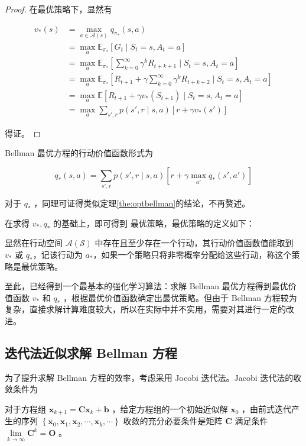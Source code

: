 \begin{proof}
    在最优策略下，显然有

     \[
    \begin{aligned}v_*(s) &= \max_{a\in \mathcal A(s)}q_{\pi_*}(s,a) \\ &=\max_a \mathbb{E}_{\pi_*} \left[G_t \mid S_t=s, A_t=a \right] \\ &= \max_a \mathbb{E}_{\pi_*} \left[\sum_{k=0}^\infty \gamma^kR_{t+k+1} \mid S_t=s,A_t=a \right] \\ &= \max_a \mathbb{E}_{\pi_*} \left[R_{t+1}+\gamma \sum_{k=0}^\infty\gamma^kR_{t+k+2}\mid S_t=s,A_t=a \right] \\ &= \max_a \mathbb{E}[R_{t+1}+\gamma v_*(S_{t+1}) \mid S_t=s,A_t=a] \\ &=\max_{a}\sum_{s',r}p(s',r \mid s,a)[r+\gamma v_*(s')]\end{aligned}
    \]

    得证。
\end{proof}

Bellman 最优方程的行动价值函数形式为

\begin{equation}
    q_*(s,a) = \sum_{s',r}p(s',r \mid s,a)\left[r+\gamma \max_{a'}q_*(s',a') \right]
\end{equation}

对于 $q_*$ ，同理可证得类似定理\ref{the:optbellman}的结论，不再赘述。

在求得 $v_*,q_*$ 的基础上，即可得到{ 最优策略}，最优策略的定义如下：

\begin{definition}
    显然在行动空间 $\mathcal{A}(\mathcal{S})$ 中存在且至少存在一个行动，其行动价值函数值能取到 $v_*$ 或 $q_*$，记该行动为 $a_*$，如果一个策略只将非零概率分配给这些行动，称这个策略是最优策略。
\end{definition}

至此，已经得到一个最基本的强化学习算法：求解 Bellman 最优方程得到最优价值函数 $v_*$ 和 $q_*$ ，根据最优价值函数确定出最优策略。但由于 Bellman 方程较为复杂，直接求解计算难度较大，所以在实际中并不实用，需要对其进行一定的改进。

\subsection{迭代法近似求解 Bellman 方程}

为了提升求解 Bellman 方程的效率，考虑采用 Jocobi 迭代法\cite{2007numanalysis}。Jacobi 迭代法的收敛条件为

\begin{definition}\label{the:jacobi}
    对于方程组 $\boldsymbol{x}_{k+1} = \boldsymbol{Cx}_{k}+\boldsymbol{b}$ ，给定方程组的一个初始近似解 $\boldsymbol{x}_0$ ，由前式迭代产生的序列 $\left\{\boldsymbol{x}_0,\boldsymbol{x}_1,\boldsymbol{x}_2,\cdots,\boldsymbol{x}_k,\cdots\right\}$ 收敛的充分必要条件是矩阵 $\boldsymbol{C}$ 满足条件 $\lim\limits_{k \rightarrow \infty} \boldsymbol{C}^{k}=\boldsymbol{O}$ 。
\end{definition}

